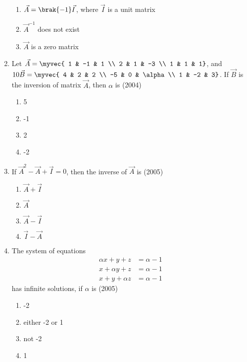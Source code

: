 \begin{enumerate}
\begin{multicols}{2}
\begin{enumerate}
			\item $\vec{A} = \brak{-1}\vec{I}$, where $\vec{I}$ is a unit matrix
			\item $\vec{A}^{-1}$ does not exist
			\item $\vec{A}$ is a zero matrix
		\end{enumerate}
\end{multicols}
	\item Let $\vec{A}=\myvec{
			1 & -1 & 1 \\
			2 & 1 & -3 \\
			1 & 1 & 1}$, and $10\vec{B}=\myvec{
			4 & 2 & 2 \\
			-5 & 0 & \alpha \\
			1 & -2 & 3}$. If $\vec{B}$ is the inversion of matrix $\vec{A}$, then $\alpha$ is \hfill{(2004)}
\begin{multicols}{4}
		\begin{enumerate}
			\item 5
			\item -1
			\item 2
			\item -2
		\end{enumerate}
\end{multicols}
	\item If $\vec{A}^2-\vec{A}+\vec{I}=0$, then the inverse of $\vec{A}$ is \hfill{(2005)}
\begin{multicols}{4}
		\begin{enumerate}
			\item $\vec{A}+\vec{I}$
			\item $\vec{A}$
			\item $\vec{A}-\vec{I}$
			\item $\vec{I}-\vec{A}$
		\end{enumerate}
\end{multicols}
	\item The system of equations 
\begin{align*}
	\alpha x+y+z  &= \alpha -1  \\
		x+ \alpha y+z &= \alpha -1 \\
		x+y+ \alpha z &= \alpha -1 
\end{align*}
		has infinite solutions, if $\alpha$ is \hfill{(2005)}
\begin{multicols}{4}
		\begin{enumerate}
			\item -2
			\item either -2 or 1
			\item not -2
			\item 1

\end{enumerate}
\end{multicols}
\end{enumerate}
